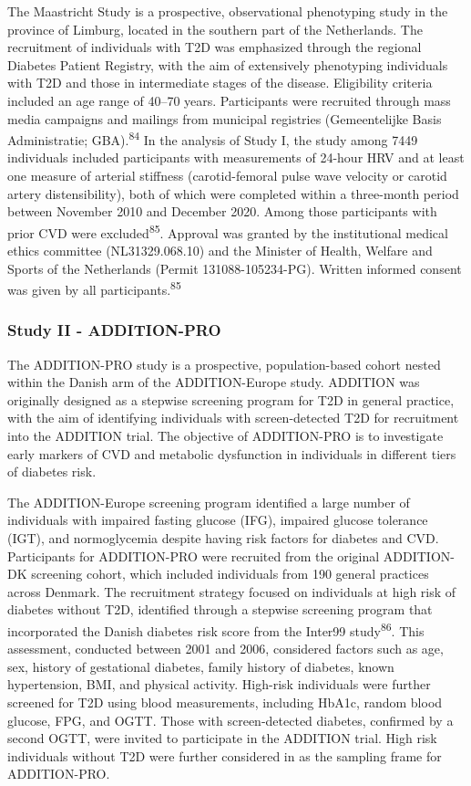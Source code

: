 \documentclass[
  a4paper,
  headsepline=true,
  open=left]{scrbook}
\begin{document}
The Maastricht Study is a prospective, observational phenotyping study
in the province of Limburg, located in the southern part of the
Netherlands. The recruitment of individuals with T2D was emphasized
through the regional Diabetes Patient Registry, with the aim of
extensively phenotyping individuals with T2D and those in intermediate
stages of the disease. Eligibility criteria included an age range of
40--70 years. Participants were recruited through mass media campaigns
and mailings from municipal registries (Gemeentelijke Basis
Administratie; GBA).\textsuperscript{84} In the analysis of Study I, the
study among 7449 individuals included participants with measurements of
24-hour HRV and at least one measure of arterial stiffness
(carotid-femoral pulse wave velocity or carotid artery distensibility),
both of which were completed within a three-month period between
November 2010 and December 2020. Among those participants with prior CVD
were excluded\textsuperscript{85}. Approval was granted by the
institutional medical ethics committee (NL31329.068.10) and the Minister
of Health, Welfare and Sports of the Netherlands (Permit
131088-105234-PG). Written informed consent was given by all
participants.\textsuperscript{85}

\hypertarget{study-ii---addition-pro}{%
\subsubsection{Study II - ADDITION-PRO}\label{study-ii---addition-pro}}

The ADDITION-PRO study is a prospective, population-based cohort nested
within the Danish arm of the ADDITION-Europe study. ADDITION was
originally designed as a stepwise screening program for T2D in general
practice, with the aim of identifying individuals with screen-detected
T2D for recruitment into the ADDITION trial. The objective of
ADDITION-PRO is to investigate early markers of CVD and metabolic
dysfunction in individuals in different tiers of diabetes risk.

The ADDITION-Europe screening program identified a large number of
individuals with impaired fasting glucose (IFG), impaired glucose
tolerance (IGT), and normoglycemia despite having risk factors for
diabetes and CVD. Participants for ADDITION-PRO were recruited from the
original ADDITION-DK screening cohort, which included individuals from
190 general practices across Denmark. The recruitment strategy focused
on individuals at high risk of diabetes without T2D, identified through
a stepwise screening program that incorporated the Danish diabetes risk
score from the Inter99 study\textsuperscript{86}. This assessment,
conducted between 2001 and 2006, considered factors such as age, sex,
history of gestational diabetes, family history of diabetes, known
hypertension, BMI, and physical activity. High-risk individuals were
further screened for T2D using blood measurements, including HbA1c,
random blood glucose, FPG, and OGTT. Those with screen-detected
diabetes, confirmed by a second OGTT, were invited to participate in the
ADDITION trial. High risk individuals without T2D were further
considered in as the sampling frame for ADDITION-PRO.
\end{document}
